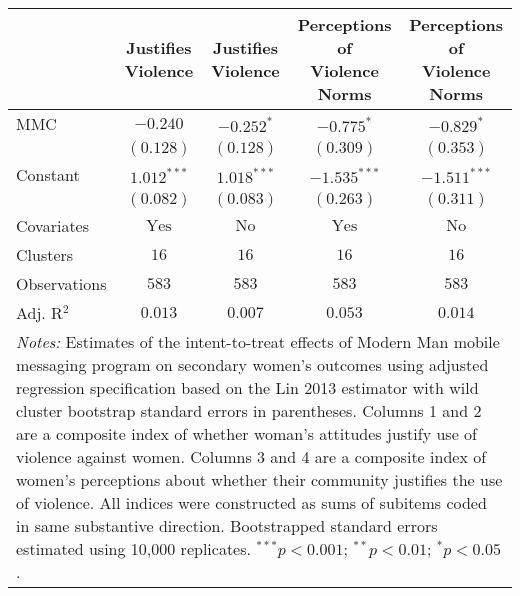 
\begin{tabular}{l c c c c}
\toprule
 & Justifies Violence & Justifies Violence & \shortstack{Perceptions of \\ Violence Norms} & \shortstack{Perceptions of \\ Violence Norms} \\
\midrule
MMC          & $-0.240$       & $-0.252^{*}$  & $-0.775^{*}$   & $-0.829^{*}$   \\
             & $(0.128)$      & $(0.128)$     & $(0.309)$      & $(0.353)$      \\
Constant     & $1.012^{***}$  & $1.018^{***}$ & $-1.535^{***}$ & $-1.511^{***}$ \\
             & $(0.082)$      & $(0.083)$     & $(0.263)$      & $(0.311)$      \\
\midrule
Covariates   & $\textrm{Yes}$ & $\textrm{No}$ & $\textrm{Yes}$ & $\textrm{No}$  \\
Clusters     & $16$           & $16$          & $16$           & $16$           \\
Observations & $583$          & $583$         & $583$          & $583$          \\
Adj. R$^2$   & $0.013$        & $0.007$       & $0.053$        & $0.014$        \\
\bottomrule
\multicolumn{5}{l}{\scriptsize{\parbox{\linewidth}{\vspace{2pt}
       \textit{Notes:} Estimates of the intent-to-treat effects of Modern Man mobile
       messaging program on secondary women's outcomes using adjusted regression
       specification based on the Lin 2013 estimator with wild cluster bootstrap
       standard errors in parentheses. Columns 1 and 2 are a composite index of
       whether woman's attitudes justify use of violence against women. Columns 3 and 4
       are a composite index of women's perceptions about whether their community justifies
       the use of violence. All indices were constructed as sums of subitems coded in
       same substantive direction. Bootstrapped standard errors estimated using 10,000 replicates. \\ $^{***}p<0.001$; $^{**}p<0.01$; $^{*}p<0.05$.}}}
\end{tabular}
